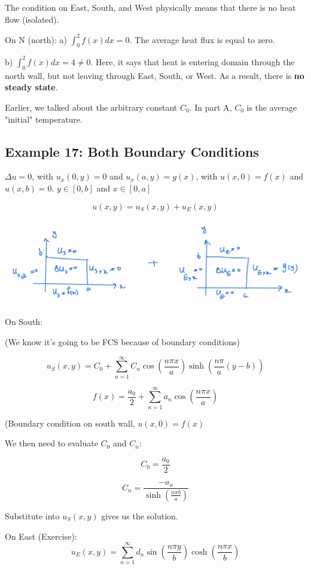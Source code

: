 \documentclass{article}
\begin{document}
The condition on East, South, and West physically means that there is no heat flow (isolated). 

On N (north): a) $\int_0^2 f(x) dx = 0$. The average heat flux is equal to zero. 

\hfill

b) $\int_0^2 f(x) dx = 4 \neq 0$. Here, it says that heat is entering domain through the north wall, but not leaving through East, South, or West. As a result, there is \textbf{no steady state}. 

Earlier, we talked about the arbitrary constant $C_0$. In part A, $C_0$ is the average "initial" temperature. 

\subsection{Example 17: Both Boundary Conditions}

$\Delta u = 0$, with $u_x(0,y) = 0$ and $u_x (a,y) = g(x)$, with $u(x,0) = f(x)$ and $u(x,b) = 0$. $y \in [0,b]$ and $x \in [0,a]$

$$u(x,y) = u_S(x,y) + u_E (x,y)$$
\begin{center}
    \includegraphics[width = 0.7 \textwidth]{6.png}
\end{center}

On South:

(We know it's going to be FCS because of boundary conditions)

$$u_S (x,y) = C_0 + \sum_{n=1}^\infty C_n \cos \left( \frac{n \pi x}{a} \right) \sinh \left( \frac{n \pi}{a} (y-b) \right)$$

$$f(x) = \frac{a_0}{2} + \sum_{n=1}^\infty a_n \cos \left( \frac{n \pi x}{a} \right)$$

(Boundary condition on south wall, $u(x,0) = f(x)$

We then need to evaluate $C_0$ and $C_n$:

$$C_0 = \frac{a_0}{2}$$

$$C_n = \frac{- a_n}{\sinh \left( \frac{n \pi b}{a} \right)}$$

Substitute into $u_S(x,y)$ gives us the solution. 

On East (Exercise):
$$u_E(x,y) = \sum_{n=1}^\infty d_n \sin \left( \frac{n \pi y}{b} \right) \cosh \left( \frac{n \pi x}{b} \right)$$
\end{document}
